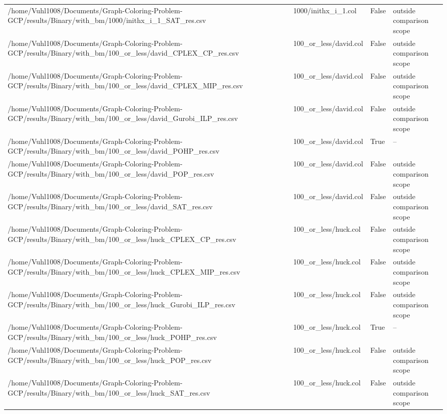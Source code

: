 \begin{table}[htbp]
\begin{tabular}{llll}
/home/Vuhl1008/Documents/Graph-Coloring-Problem-GCP/results/Binary/with\_bm/1000/inithx\_i\_1\_SAT\_res.csv & 1000/inithx\_i\_1.col & False & outside comparison scope \\
/home/Vuhl1008/Documents/Graph-Coloring-Problem-GCP/results/Binary/with\_bm/100\_or\_less/david\_CPLEX\_CP\_res.csv & 100\_or\_less/david.col & False & outside comparison scope \\
/home/Vuhl1008/Documents/Graph-Coloring-Problem-GCP/results/Binary/with\_bm/100\_or\_less/david\_CPLEX\_MIP\_res.csv & 100\_or\_less/david.col & False & outside comparison scope \\
/home/Vuhl1008/Documents/Graph-Coloring-Problem-GCP/results/Binary/with\_bm/100\_or\_less/david\_Gurobi\_ILP\_res.csv & 100\_or\_less/david.col & False & outside comparison scope \\
/home/Vuhl1008/Documents/Graph-Coloring-Problem-GCP/results/Binary/with\_bm/100\_or\_less/david\_POHP\_res.csv & 100\_or\_less/david.col & True & -- \\
/home/Vuhl1008/Documents/Graph-Coloring-Problem-GCP/results/Binary/with\_bm/100\_or\_less/david\_POP\_res.csv & 100\_or\_less/david.col & False & outside comparison scope \\
/home/Vuhl1008/Documents/Graph-Coloring-Problem-GCP/results/Binary/with\_bm/100\_or\_less/david\_SAT\_res.csv & 100\_or\_less/david.col & False & outside comparison scope \\
/home/Vuhl1008/Documents/Graph-Coloring-Problem-GCP/results/Binary/with\_bm/100\_or\_less/huck\_CPLEX\_CP\_res.csv & 100\_or\_less/huck.col & False & outside comparison scope \\
/home/Vuhl1008/Documents/Graph-Coloring-Problem-GCP/results/Binary/with\_bm/100\_or\_less/huck\_CPLEX\_MIP\_res.csv & 100\_or\_less/huck.col & False & outside comparison scope \\
/home/Vuhl1008/Documents/Graph-Coloring-Problem-GCP/results/Binary/with\_bm/100\_or\_less/huck\_Gurobi\_ILP\_res.csv & 100\_or\_less/huck.col & False & outside comparison scope \\
/home/Vuhl1008/Documents/Graph-Coloring-Problem-GCP/results/Binary/with\_bm/100\_or\_less/huck\_POHP\_res.csv & 100\_or\_less/huck.col & True & -- \\
/home/Vuhl1008/Documents/Graph-Coloring-Problem-GCP/results/Binary/with\_bm/100\_or\_less/huck\_POP\_res.csv & 100\_or\_less/huck.col & False & outside comparison scope \\
/home/Vuhl1008/Documents/Graph-Coloring-Problem-GCP/results/Binary/with\_bm/100\_or\_less/huck\_SAT\_res.csv & 100\_or\_less/huck.col & False & outside comparison scope \\

\end{tabular}
\end{table}
